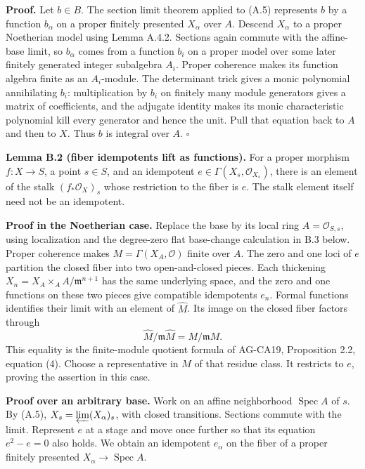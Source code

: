 \documentclass[11pt]{article}
\begin{document}
\textbf{Proof.} Let \(b\in B\). The section limit theorem applied to
(A.5) represents \(b\) by a function \(b_\alpha\) on a proper finitely
presented \(X_\alpha\) over \(A\). Descend \(X_\alpha\) to a proper
Noetherian model using Lemma A.4.2. Sections again commute with the
affine-base limit, so \(b_\alpha\) comes from a function \(b_i\) on a
proper model over some later finitely generated integer subalgebra
\(A_i\). Proper coherence makes its function algebra finite as an
\(A_i\)-module. The determinant trick gives a monic polynomial
annihilating \(b_i\): multiplication by \(b_i\) on finitely many module
generators gives a matrix of coefficients, and the adjugate identity
makes its monic characteristic polynomial kill every generator and hence
the unit. Pull that equation back to \(A\) and then to \(X\). Thus \(b\)
is integral over \(A\). \(\square\)

\textbf{Lemma B.2 (fiber idempotents lift as functions).} For a proper
morphism \(f:X\to S\), a point \(s\in S\), and an idempotent
\(e\in\Gamma(X_s,\mathcal O_{X_s})\), there is an element of the stalk
\((f_*\mathcal O_X)_s\) whose restriction to the fiber is \(e\). The
stalk element itself need not be an idempotent.

\textbf{Proof in the Noetherian case.} Replace the base by its local
ring \(A=\mathcal O_{S,s}\), using localization and the degree-zero flat
base-change calculation in B.3 below. Proper coherence makes
\(M=\Gamma(X_A,\mathcal O)\) finite over \(A\). The zero and one loci of
\(e\) partition the closed fiber into two open-and-closed pieces. Each
thickening \(X_n=X_A\times_A A/\mathfrak m^{n+1}\) has the same
underlying space, and the zero and one functions on these two pieces
give compatible idempotents \(e_n\). Formal functions identifies their
limit with an element of \(\widehat M\). Its image on the closed fiber
factors through \[
\widehat M/\mathfrak m\widehat M=M/\mathfrak mM.
\] This equality is the finite-module quotient formula of AG-CA19,
Proposition 2.2, equation (4). Choose a representative in \(M\) of that
residue class. It restricts to \(e\), proving the assertion in this
case.

\textbf{Proof over an arbitrary base.} Work on an affine neighborhood
\(\operatorname{Spec}A\) of \(s\). By (A.5),
\(X_s=\varprojlim (X_\alpha)_s\), with closed transitions. Sections
commute with the limit. Represent \(e\) at a stage and move once further
so that its equation \(e^2-e=0\) also holds. We obtain an idempotent
\(e_\alpha\) on the fiber of a proper finitely presented
\(X_\alpha\to\operatorname{Spec}A\).
\end{document}
